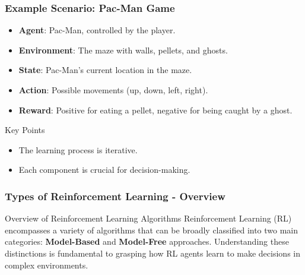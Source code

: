 \documentclass[aspectratio=169]{beamer}
\begin{document}
\begin{frame}[fragile]
    \frametitle{Example Scenario: Pac-Man Game}
    \begin{itemize}
        \item \textbf{Agent}: Pac-Man, controlled by the player.
        \item \textbf{Environment}: The maze with walls, pellets, and ghosts.
        \item \textbf{State}: Pac-Man's current location in the maze.
        \item \textbf{Action}: Possible movements (up, down, left, right).
        \item \textbf{Reward}: Positive for eating a pellet, negative for being caught by a ghost.
    \end{itemize}
    \begin{block}{Key Points}
        \begin{itemize}
            \item The learning process is iterative.
            \item Each component is crucial for decision-making.
        \end{itemize}
    \end{block}
\end{frame}

\begin{frame}[fragile]
    \frametitle{Types of Reinforcement Learning - Overview}
    \begin{block}{Overview of Reinforcement Learning Algorithms}
        Reinforcement Learning (RL) encompasses a variety of algorithms that can be broadly classified into two main categories: 
        \textbf{Model-Based} and \textbf{Model-Free} approaches. Understanding these distinctions is fundamental to grasping how RL agents learn to make decisions in complex environments.
    \end{block}
\end{frame}
\end{document}
